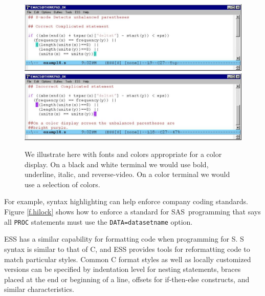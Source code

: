 \documentclass{article}
\newif\ifdraft
\newcommand*{\SAS}{\textsc{SAS}}
\newcommand{\stexttt}[1]{{\small\texttt{#1}}}
\newcommand{\emptyfig}{
\hspace*{42pt}\rule{324pt}{.25pt}\\
\hspace*{42pt}\rule{.25pt}{10pc}
\rule{316pt}{.25pt}
\rule{.25pt}{10pc}}
\newenvironment{Comment}{\begin{quote}\small\itshape }{\end{quote}}
\begin{document}
\begin{figure}[tbp]%
  \centering
\ifdraft
  \emptyfig
\else
  \includegraphics[angle=270,width=\textwidth]{font-cor-s}
  \includegraphics[angle=270,width=\textwidth]{font-incor-s}
\fi
  \caption{We illustrate here with fonts and colors appropriate for a
    color display.  On a black and white terminal we would use bold,
    underline, italic, and reverse-video.  On a color terminal we
    would use a selection of colors.}
  \label{f.font}
\end{figure}

For example, syntax highlighting can help enforce company coding
standards.  Figure \ref{f.hilock} shows how to enforce a standard for
\SAS\ programming that says all \stexttt{PROC} statements must use the
\stexttt{DATA=datasetname} option.

ESS has a similar capability for formatting code when programming for
S.  S syntax is similar to that of C, and ESS provides tools for
reformatting code to match particular styles.  Common C format styles
as well as locally customized versions can be specified by indentation
level for nesting statements, braces placed at the end or beginning of
a line, offsets for if-then-else constructs, and similar
characteristics.

\end{document}

